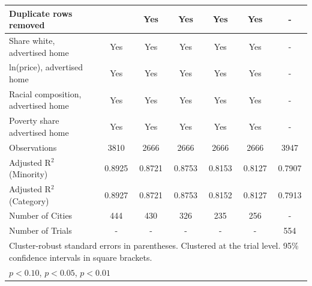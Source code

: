 \begin{table}[htbp]
{\begin{tabular}{l*{6}{c}}
Duplicate rows removed &  & Yes & Yes & Yes & Yes & - \\
\midrule
Share white, advertised home  & Yes & Yes & Yes & Yes & Yes & - \\
ln(price), advertised home  & Yes & Yes & Yes & Yes & Yes & - \\
Racial composition, advertised home & Yes & Yes & Yes & Yes & Yes & - \\
Poverty share advertised home & Yes & Yes & Yes & Yes & Yes & - \\
Observations & 3810 & 2666 & 2666 & 2666 & 2666 & 3947 \\
Adjusted R$^2$ (Minority) & 0.8925 & 0.8721 & 0.8753 & 0.8153 & 0.8127 & 0.7907 \\
Adjusted R$^2$ (Category) & 0.8927 & 0.8721 & 0.8753 & 0.8152 & 0.8127 & 0.7913 \\
Number of Cities & 444 & 430 & 326 & 235 & 256 & - \\
Number of Trials & - & - & - & - & - & 554 \\
\bottomrule
\multicolumn{7}{l}{\footnotesize Cluster-robust standard errors in parentheses. Clustered at the trial level. 95\% confidence intervals in square brackets.}\\
\multicolumn{7}{l}{\footnotesize \sym{*} \(p<0.10\), \sym{**} \(p<0.05\), \sym{***} \(p<0.01\)}\\
\end{tabular}
}
\end{table}
